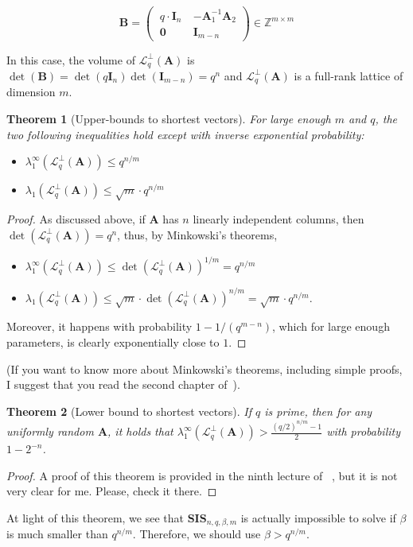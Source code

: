 \documentclass[a4paper,11pt]{article}
\let\vec\mathbf %
\newcommand\Z{{\mathbb Z}}
\newcommand\A{{\mathbf A}}
\newcommand\LqA{\mathcal{L}_q^{\bot}\left(\A\right)}
\newcommand\SIS{\textbf{SIS}_{n, q, \beta, m}}
\newtheorem{theorem}{Theorem}[section]
\theoremstyle{definition}
\theoremstyle{remark}
\begin{document}
$$
\vec{B} =
    \begin{pmatrix}
    ~q\cdot\vec{I}_n~  & -\A_1^{-1}\A_2 \\
    ~\vec 0~  & \vec{I}_{m-n}
    \end{pmatrix} \in \Z^{m \times m}
$$

In this case, the volume of $\LqA$ is $\det(\vec B) = \det(q\vec{I}_n)
\det({\vec I}_{m-n}) = q^n$ and $\LqA$ is a full-rank lattice of dimension $m$.

\begin{theorem}[Upper-bounds to shortest vectors]
For large enough $m$ and $q$, the two following inequalities hold except with
inverse exponential probability:
\begin{itemize}
\item $\lambda_1^{\infty}(\LqA) \le q^{n/m}$
\item $\lambda_1(\LqA) \le \sqrt{m}\cdot q^{n/m}$
\end{itemize}
\end{theorem}
\begin{proof}
As discussed above, if $\A$ has $n$ linearly independent columns, then
$\det(\LqA) = q^n$, thus, by Minkowski's theorems,
\begin{itemize}
\item $\lambda_1^{\infty}(\LqA) \le \det(\LqA)^{1/m} = q^{n/m}$
\item $\lambda_1(\LqA) \le \sqrt{m}\cdot \det(\LqA)^{n/m} = \sqrt{m}\cdot
q^{n/m}$.
\end{itemize}

Moreover, it happens with probability $1- 1/(q^{m-n})$, which for large enough
parameters, is clearly exponentially close to $1$.
\end{proof}

(If you want to know more about Minkowski's theorems, including simple proofs,
I suggest that you read the second chapter of~\cite{mic14}).

\begin{theorem}[Lower bound to shortest vectors]
If $q$ is prime, then for any uniformly random $\A$, it holds that
$\lambda_1^{\infty}(\LqA) > \frac{(q/2)^{n/m} -1}{2}$ with probability $1 -
2^{-n}$.
\end{theorem}
\begin{proof}
A proof of this theorem is provided in the ninth lecture of ~\cite{dd18}, but
it is not very clear for me. Please, check it there.
\end{proof}

At light of this theorem, we see that  $\SIS$ is actually impossible to solve if
$\beta$ is much smaller than $q^{n/m}$. Therefore, we should use $\beta >
q^{n/m}$.
\end{document}
